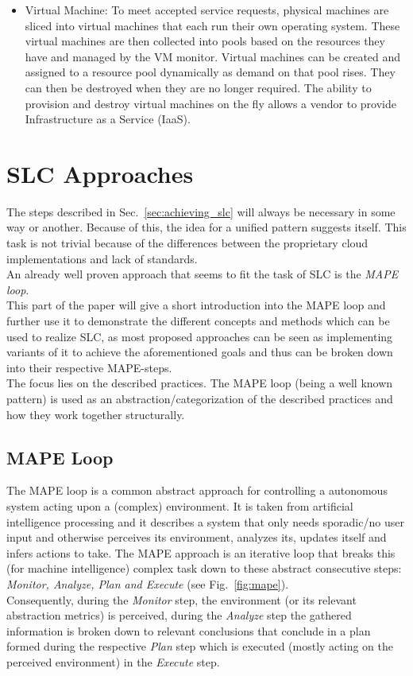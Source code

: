\documentclass[a4paper]{llncs}
\begin{document}
\begin{itemize}
	\item Virtual Machine: To meet accepted service requests, physical machines are sliced into virtual machines that each run their own operating system. These virtual machines are then collected into pools based on the resources they have and managed by the VM monitor. Virtual machines can be created and assigned to a resource pool dynamically as demand on that pool rises. They can then be destroyed when they are no longer required. The ability to provision and destroy virtual machines on the fly allows a vendor to provide Infrastructure as a Service (IaaS).\\
	\end{itemize}

\section{SLC Approaches}
The steps described in Sec.~\ref{sec:achieving_slc} will always be necessary in some way or another. Because of this, the idea for a unified pattern suggests itself. This task is not trivial because of the differences between the proprietary cloud implementations and lack of standards.\\

An already well proven approach that seems to fit the task of SLC is the \textit{MAPE loop}.\\
This part of the paper will give a short introduction into the MAPE loop and further use it to demonstrate the different concepts and methods which can be used to realize SLC, as most proposed approaches can be seen as implementing variants of it to achieve the aforementioned goals and thus can be broken down into their respective MAPE-steps.\\
The focus lies on the described practices. The MAPE loop (being a well known pattern) is used as an abstraction/categorization of the described practices and how they work together structurally.

\subsection{MAPE Loop}
The MAPE loop is a common abstract approach for controlling a autonomous system acting upon a (complex) environment. It is taken from artificial intelligence processing and it describes a system that only needs sporadic/no user input and otherwise perceives its environment, analyzes its, updates itself and infers actions to take. The MAPE approach is an iterative loop that breaks this (for machine intelligence) complex task down to these abstract consecutive steps: \textit{Monitor, Analyze, Plan and Execute} (see Fig.~\ref{fig:mape}).\\
Consequently, during the \textit{Monitor} step, the environment (or its relevant abstraction metrics) is perceived, during the \textit{Analyze} step the gathered information is broken down to relevant conclusions that conclude in a plan formed during the respective \textit{Plan} step which is executed (mostly acting on the perceived environment) in the \textit{Execute} step.\\
\end{document}
